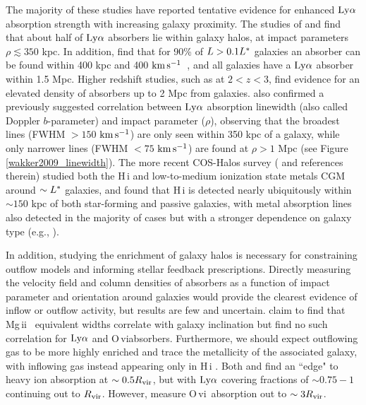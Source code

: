 \documentclass[twocolumn,tighten]{aastex62}
\newcommand{\kms}{$\rm km\, s^{-1}$}
\newcommand{\HI}{\mbox{H\,{\sc i}} }
\newcommand{\II}{\,{\sc ii}}
\newcommand{\VI}{\,{\sc vi}}
\begin{document}
The majority of these studies have reported tentative evidence for enhanced $\rm Ly\alpha$ absorption strength with increasing galaxy proximity. The studies of \cite{cote2005} and \cite{prochaska2006} find that about half of $\rm Ly\alpha$ absorbers lie within galaxy halos, at impact parameters $\rho \lesssim 350$ kpc. In addition, \cite{wakker2009} find that for 90\% of $L > 0.1 L^{\**}$ galaxies an absorber can be found within 400 kpc and 400 \kms~, and all galaxies have a $\rm Ly\alpha$ absorber within 1.5 Mpc. Higher redshift studies, such as \cite{rudie2012a} at $2 < z < 3$, find evidence for an elevated density of absorbers up to 2 Mpc from galaxies. \cite{wakker2009} also confirmed a previously suggested correlation between $\rm Ly\alpha$ absorption linewidth (also called Doppler $b$-parameter) and impact parameter ($\rho$), observing that the broadest lines (FWHM $>150$ \kms) are only seen within 350 kpc of a galaxy, while only narrower lines (FWHM $<75$ \kms) are found at $\rho > 1$ Mpc (see Figure \ref{wakker2009_linewidth}). The more recent COS-Halos survey (\citealt{tumlinson2013} and references therein) studied both the \HI and low-to-medium ionization state metals CGM around $\sim L^{\**}$ galaxies, and found that \HI is detected nearly ubiquitously within $\sim150$ kpc of both star-forming and passive galaxies, with metal absorption lines also detected in the majority of cases but with a stronger dependence on galaxy type (e.g., \citealt{tumlinson2011b, werk2013}). 


In addition, studying the enrichment of galaxy halos is necessary for constraining outflow models and informing stellar feedback prescriptions. Directly measuring the velocity field and column densities of absorbers as a function of impact parameter and orientation around galaxies would provide the clearest evidence of inflow or outflow activity, but results are few and uncertain. \cite{kacprzak2011_inclination} claim to find that Mg\II~ equivalent widths correlate with galaxy inclination but \cite{mathes2014} find no such correlation for $\rm Ly\alpha$ and O\VI absorbers. Furthermore, we should expect outflowing gas to be more highly enriched and trace the metallicity of the associated galaxy, with inflowing gas instead appearing only in \HI. Both \cite{stocke2013} and \cite{liang2014} find an ``edge" to heavy ion absorption at $\sim 0.5 R_{\rm vir}$, but with $\rm Ly\alpha$ covering fractions of $\sim 0.75 - 1$ continuing out to $R_{\rm vir}$. However, \cite{mathes2014} measure O\VI~absorption out to $\sim 3 R_{\rm vir}$.
\end{document}
